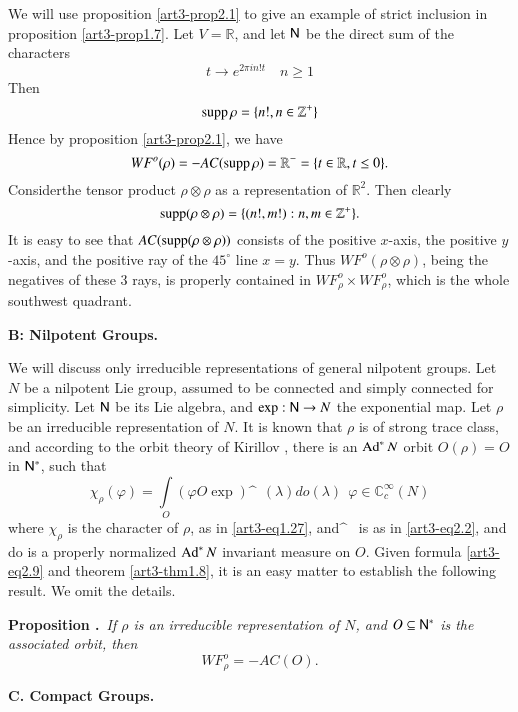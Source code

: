We will use proposition \ref{art3-prop2.1} to give an example of strict inclusion in proposition \ref{art3-prop1.7}. Let $V=\mathbb{R}$, and let $\mathsf{N}$ be the direct sum of the characters
$$
t\to e^{2\pi in!t}\quad n\geq 1
$$
Then 
$$
\operatorname{supp} \rho=\{n!,n\in \mathbb{Z}^{+}\}
$$
Hence by proposition \ref{art3-prop2.1}, we have
$$
WF^{o}(\rho)=-AC(\operatorname{supp} \rho)=\mathbb{R}^{-}=\{t\in \mathbb{R}, t\leq 0\}.
$$
Consider\pageoriginale the tensor product $\rho\otimes \rho$ as a representation of $\mathbb{R}^{2}$. Then clearly
$$
\operatorname{supp}(\rho\otimes \rho)=\{(n!,m!):n,m\in \mathbb{Z}^{+}\}.
$$
It is easy to see that $AC(\operatorname{supp} (\rho\otimes \rho))$ consists of the positive $x$-axis, the positive $y$-axis, and the positive ray of the $45^{\circ}$ line $x=y$. Thus $WF^{o}(\rho\otimes\rho)$, being the negatives of these 3 rays, is properly contained in $WF^{o}_{\rho}\times WF^{o}_{\rho}$, which is the whole southwest quadrant.

\bigskip
\noindent
{\bf B: Nilpotent Groups.}
\smallskip

We will discuss only irreducible representations of general nilpotent groups. Let $N$ be a nilpotent Lie group, assumed to be connected and simply connected for simplicity. Let $\mathsf{N}$ be its Lie algebra, and $\exp:\mathsf{N}\to N$ the exponential map. Let $\rho$ be an irreducible representation of $N$. It is known that $\rho$ is of strong trace class, and according to the orbit theory of Kirillov \cite{art3-K}, there is an $\operatorname{Ad}^{*}N$ orbit $O(\rho)=O$ in $\mathsf{N}^{*}$, such that
\begin{equation*}
\chi_{\rho}(\varphi)=\int\limits_{O}(\varphi O \exp)\sphat \ \ (\lambda) do(\lambda) \ \ \varphi\in \mathbb{C}^{\infty}_{c}(N)\tag{2.9}\label{art3-eq2.9}
\end{equation*}
where $\chi_{\rho}$ is the character of $\rho$, as in \eqref{art3-eq1.27}, and$\sphat$ \ is as in \eqref{art3-eq2.2}, and do is a properly normalized $\operatorname{Ad}^{*}N$ invariant measure on $O$. Given formula \eqref{art3-eq2.9} and theorem \ref{art3-thm1.8}, it is an easy matter to establish the following result. We omit the details.

\medskip
\noindent
{\bf Proposition .\label{art3-prop2.2}}~{\em If $\rho$ is an irreducible representation of $N$, and $O\subseteq \mathsf{N}^{*}$ is the associated orbit, then}
\begin{equation*}
WF^{o}_{\rho}=-AC(O).\tag{2.10}\label{art3-eq2.10}
\end{equation*}

\medskip
\noindent
{\bf C. Compact Groups.}
\smallskip

